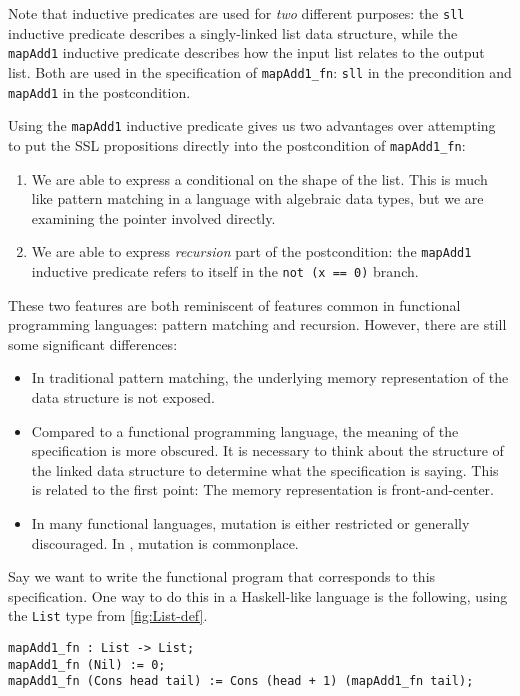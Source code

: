 \noindent
Note that inductive predicates are used for \textit{two} different purposes: the \verb|sll| inductive
predicate describes a singly-linked list data structure, while the \verb|mapAdd1| inductive predicate 
describes how the input list relates to the output list. Both are used in the specification of
\verb|mapAdd1_fn|: \verb|sll| in the precondition and \verb|mapAdd1| in the postcondition.

Using the \verb|mapAdd1| inductive predicate gives us two advantages over attempting to
put the SSL propositions directly into the postcondition of \verb|mapAdd1_fn|:
%
\begin{enumerate}
  \item We are able to express a conditional on the shape of the list. This is much like pattern
    matching in a language with algebraic data types, but we are examining the pointer involved directly.
  \item We are able to express \textit{recursion} part of the postcondition: the \verb|mapAdd1| inductive
    predicate refers to itself in the \verb|not (x == 0)| branch.
\end{enumerate}
%
These two features are both reminiscent of features common in
functional programming languages: pattern matching and recursion.
However, there are still some significant differences:

\begin{itemize}
  \item In traditional pattern matching, the underlying memory representation of the data structure is not exposed.
  \item Compared to a functional programming language, the meaning of the specification is more obscured. It is
    necessary to think about the structure of the linked data structure to determine what the specification is saying. This
    is related to the first point: The memory representation is front-and-center.
  \item In many functional languages, mutation is either restricted or generally discouraged. In \SuSLik, mutation is commonplace.
\end{itemize}

Say we want to write the functional program that corresponds to this specification. One way to do this in a Haskell-like language
is the following, using the \verb|List| type from \autoref{fig:List-def}.

\begin{lstlisting}[language=Pika]
mapAdd1_fn : List -> List;
mapAdd1_fn (Nil) := 0;
mapAdd1_fn (Cons head tail) := Cons (head + 1) (mapAdd1_fn tail);
\end{lstlisting}

